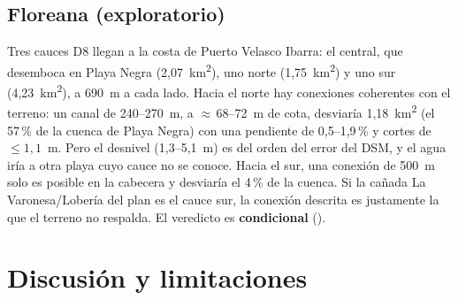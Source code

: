 \documentclass{sosg-informe}
\newcommand{\kmc}{km\textsuperscript{2}}
\begin{document}
\subsection{Floreana (exploratorio)}
Tres cauces D8 llegan a la costa de Puerto Velasco Ibarra: el central, que desemboca en Playa Negra (2,07~\kmc), uno norte (1,75~\kmc) y uno sur (4,23~\kmc), a 690~m a cada lado. Hacia el norte hay conexiones coherentes con el terreno: un canal de 240--270~m, a ${\approx}\,68$--72~m de cota, desviaría 1,18~\kmc{} (el 57\,\% de la cuenca de Playa Negra) con una pendiente de 0,5--1,9\,\% y cortes de $\leq 1{,}1$~m. Pero el desnivel (1,3--5,1~m) es del orden del error del DSM, y el agua iría a otra playa cuyo cauce no se conoce. Hacia el sur, una conexión de 500~m solo es posible en la cabecera y desviaría el 4\,\% de la cuenca. Si la cañada La Varonesa/Lobería del plan es el cauce sur, la conexión descrita es justamente la que el terreno no respalda. El veredicto es \textbf{condicional} ().

\section{Discusión y limitaciones}
\end{document}
